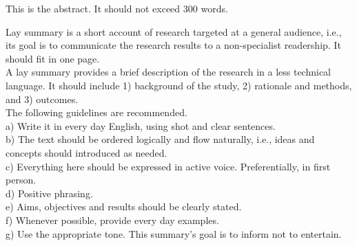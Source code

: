 
\begin{prefatory}




\frontpage


\abstract%
This is the abstract. It should not exceed $300$ words.


\dedication%
{\flushright
To whom you what to dedicate this work\\
}


\laysummary %
Lay summary is a short account of research targeted at a general
audience, i.e., its goal is to communicate the research results to a
non-specialist readership. It should fit in one page.\\[12pt]%
A lay summary provides a brief description of the research in a less
technical language. It should include 1) background of the study, 2)
rationale and methods, and 3) outcomes.\\[12pt]%
The following guidelines are recommended.\\%
a) Write it in every day English, using shot and clear sentences.\\%
b) The text should be ordered logically and flow naturally, i.e.,
ideas and concepts should introduced as needed.\\%
c) Everything here should be expressed in active
voice. Preferentially, in first person.\\%
d) Positive phrasing.\\%
e) Aims, objectives and results should be clearly stated.\\%
f) Whenever possible, provide every day examples.\\%
g) Use the appropriate tone. This summary's goal is to inform not to
entertain.


\end{prefatory}
